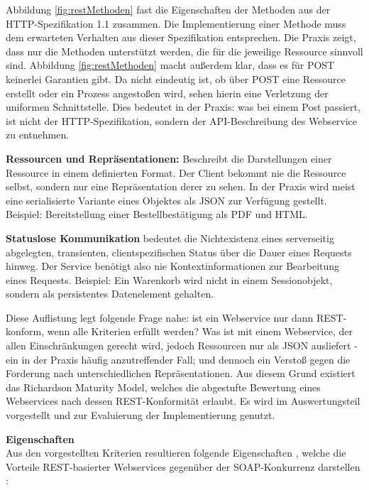 \documentclass[12pt,a4paper,bibliography=totocnumbered,listof=totoc]{scrartcl}
\begin{document}
\begin{compactitem}
Abbildung \ref{fig:restMethoden} fast die Eigenschaften der Methoden aus der HTTP-Spezifikation 1.1 zusammen. Die Implementierung einer Methode muss dem erwarteten Verhalten aus dieser Spezifikation entsprechen. Die Praxis zeigt, dass nur die Methoden unterstützt werden, die für die jeweilige Ressource sinnvoll sind. Abbildung \ref{fig:restMethoden} macht außerdem klar, dass es für POST keinerlei Garantien gibt. Da nicht eindeutig ist, ob über POST eine Ressource erstellt oder ein Prozess angestoßen wird, sehen \citeauthor{richardson07} hierin eine Verletzung der uniformen Schnittstelle. Dies bedeutet in der Praxis: was bei einem Post passiert, ist nicht der HTTP-Spezifikation, sondern der API-Beschreibung des Webservice zu entnehmen.
\item \textbf{Ressourcen und Repräsentationen:} Beschreibt die Darstellungen einer Ressource in einem definierten Format. Der Client bekommt nie die Ressource selbst, sondern nur eine Repräsentation derer zu sehen. In der Praxis wird meist eine  serialisierte Variante eines Objektes als JSON zur Verfügung gestellt. Beispiel: Bereitstellung einer Bestellbestätigung als PDF und HTML.
\item \textbf{Statuslose Kommunikation} bedeutet die Nichtexistenz eines serverseitig abgelegten, transienten, clientspezifischen Status über die Dauer eines Requests hinweg. Der Service benötigt also nie Kontextinformationen zur Bearbeitung eines Requests. Beispiel: Ein Warenkorb wird nicht in einem Sessionobjekt, sondern als persistentes Datenelement gehalten.
\end{compactitem}

Diese Auflistung legt folgende Frage nahe: ist ein Webservice nur dann REST-konform, wenn alle Kriterien erfüllt werden? Was ist mit einem Webservice, der allen Einschränkungen gerecht wird, jedoch Ressourcen nur als JSON ausliefert - ein in der Praxis häufig anzutreffender Fall; und dennoch ein Verstoß gegen die Forderung nach unterschiedlichen Repräsentationen. Aus diesem Grund existiert das \glqq Richardson Maturity Model\grqq{}, welches die abgestufte Bewertung eines Webservices nach dessen REST-Konformität erlaubt. Es wird im Auswertungsteil vorgestellt und zur Evaluierung der Implementierung genutzt.

\textbf{Eigenschaften}\\
Aus den vorgestellten Kriterien resultieren folgende Eigenschaften \citep{tilkov11},  welche die Vorteile REST-basierter Webservices gegenüber der SOAP-Konkurrenz darstellen \citep{richardson07}:
\end{document}
